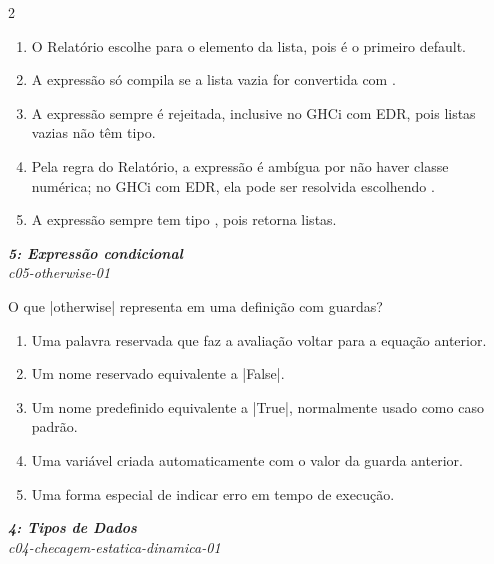 \documentclass[a4paper,10pt,brazil]{article}
\begin{document}
\begin{multicols}{2}
\begin{enumerate}
  \item O Relatório escolhe  para o elemento da lista, pois  é o primeiro default.
  \item A expressão só compila se a lista vazia for convertida com .
  \item A expressão sempre é rejeitada, inclusive no GHCi com EDR, pois listas vazias não têm tipo.
  \item Pela regra do Relatório, a expressão é ambígua por não haver classe numérica; no GHCi com EDR, ela pode ser resolvida escolhendo .
  \item A expressão sempre tem tipo \haskellinline{[String]}, pois  retorna listas.

\end{enumerate}

\begin{flushright}
  \footnotesize
  \textit{\textbf{5: Expressão condicional}}\\
  \textit{c05-otherwise-01}\\

\end{flushright}
O que \haskellinline|otherwise| representa em uma definição com guardas?

\begin{enumerate}
  \item Uma palavra reservada que faz a avaliação voltar para a equação anterior.

  \item Um nome reservado equivalente a \haskellinline|False|.

  \item Um nome predefinido equivalente a \haskellinline|True|, normalmente usado como caso padrão.

  \item Uma variável criada automaticamente com o valor da guarda anterior.

  \item Uma forma especial de indicar erro em tempo de execução.


\end{enumerate}

\begin{flushright}
  \footnotesize
  \textit{\textbf{4: Tipos de Dados}}\\
  \textit{c04-checagem-estatica-dinamica-01}\\


\end{flushright}
\end{multicols}
\end{document}
